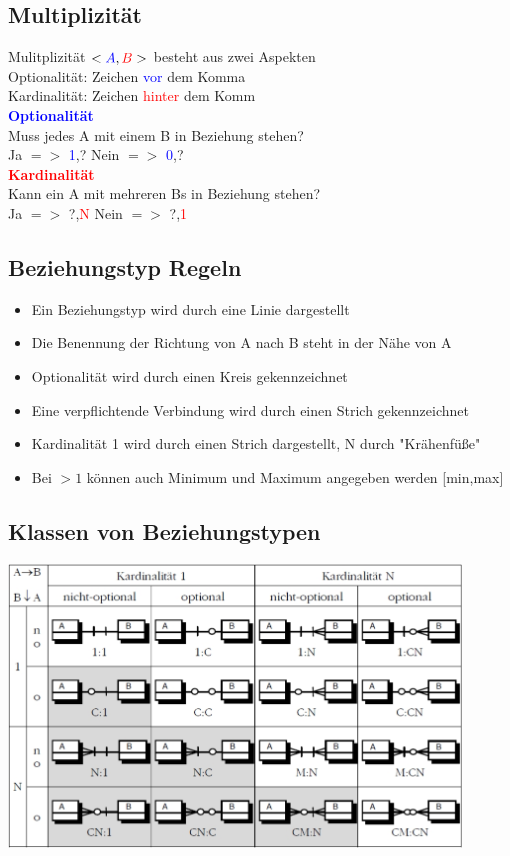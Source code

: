 \documentclass{scrreprt}
\newcommand\tab[1][1cm]{\hspace*{#1}}
\begin{document}
\subsection{Multiplizität}
Mulitplizität $<\textcolor{blue}{A},\textcolor{red}{B}>$ besteht aus zwei Aspekten
\\\tab Optionalität: Zeichen \textcolor{blue}{vor} dem Komma
\\\tab Kardinalität: Zeichen \textcolor{red}{hinter} dem Komm
\\\textcolor{blue}{\textbf{Optionalität}}
\\\tab Muss jedes A mit einem B in Beziehung stehen?
\\\tab Ja $=>$ \textcolor{blue}{1},? \tab Nein $=>$ \textcolor{blue}{0},?
\\\textcolor{red}{\textbf{Kardinalität}}
\\\tab Kann ein A mit mehreren Bs in Beziehung stehen?
\\\tab Ja $=>$ ?,\textcolor{red}{N} \tab Nein $=>$ ?,\textcolor{red}{1}
\subsection{Beziehungstyp Regeln}
\begin{itemize}
  \item Ein Beziehungstyp wird durch eine Linie dargestellt
  \item Die Benennung der Richtung von A nach B steht in der Nähe von A
  \item Optionalität wird durch einen Kreis gekennzeichnet
  \item Eine verpflichtende Verbindung wird durch einen Strich gekennzeichnet
  \item Kardinalität 1 wird durch einen Strich dargestellt, N durch "Krähenfüße"
  \item Bei $>1$ können auch Minimum und Maximum angegeben werden [min,max]
\end{itemize}
\subsection{Klassen von Beziehungstypen}
\includegraphics[width=0.9\textwidth]{"graphics/kardin"}
\end{document}

